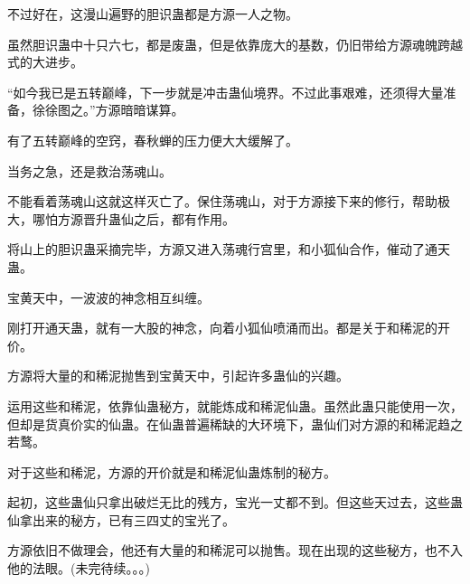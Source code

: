 \begin{this_body}
不过好在，这漫山遍野的胆识蛊都是方源一人之物。

虽然胆识蛊中十只六七，都是废蛊，但是依靠庞大的基数，仍旧带给方源魂魄跨越式的大进步。

“如今我已是五转巅峰，下一步就是冲击蛊仙境界。不过此事艰难，还须得大量准备，徐徐图之。”方源暗暗谋算。

有了五转巅峰的空窍，春秋蝉的压力便大大缓解了。

当务之急，还是救治荡魂山。

不能看着荡魂山这就这样灭亡了。保住荡魂山，对于方源接下来的修行，帮助极大，哪怕方源晋升蛊仙之后，都有作用。

将山上的胆识蛊采摘完毕，方源又进入荡魂行宫里，和小狐仙合作，催动了通天蛊。

宝黄天中，一波波的神念相互纠缠。

刚打开通天蛊，就有一大股的神念，向着小狐仙喷涌而出。都是关于和稀泥的开价。

方源将大量的和稀泥抛售到宝黄天中，引起许多蛊仙的兴趣。

运用这些和稀泥，依靠仙蛊秘方，就能炼成和稀泥仙蛊。虽然此蛊只能使用一次，但却是货真价实的仙蛊。在仙蛊普遍稀缺的大环境下，蛊仙们对方源的和稀泥趋之若鹜。

对于这些和稀泥，方源的开价就是和稀泥仙蛊炼制的秘方。

起初，这些蛊仙只拿出破烂无比的残方，宝光一丈都不到。但这些天过去，这些蛊仙拿出来的秘方，已有三四丈的宝光了。

方源依旧不做理会，他还有大量的和稀泥可以抛售。现在出现的这些秘方，也不入他的法眼。(未完待续。。。)

\end{this_body}

